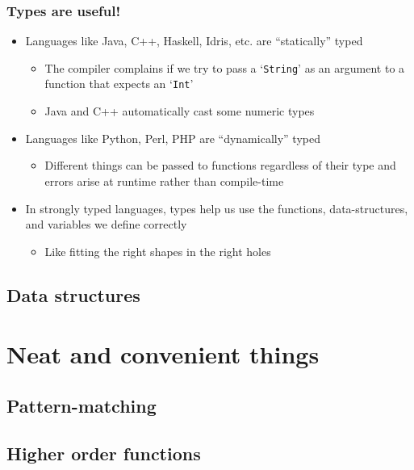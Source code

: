 \documentclass{beamer}
\begin{document}
  \begin{frame}
    \frametitle{Types are useful!}

    \begin{itemize}
      \item Languages like Java, C++, Haskell, Idris, etc. are ``statically''
            typed
        \begin{itemize}
          \item The compiler complains if we try to pass a `\texttt{String}' as an
                argument to a function that expects an `\texttt{Int}'
          \item Java and C++ automatically cast some numeric types
        \end{itemize}
      \item Languages like Python, Perl, PHP are ``dynamically'' typed
        \begin{itemize}
          \item Different things can be passed to functions regardless of their
                type and errors arise at runtime rather than compile-time
        \end{itemize}
      \item In strongly typed languages, types help us use the functions,
            data-structures, and variables we define correctly
        \begin{itemize}
          \item Like fitting the right shapes in the right holes
        \end{itemize}
    \end{itemize}

  \end{frame}

  \subsection{Data structures}


\section{Neat and convenient things}
  \subsection{Pattern-matching}

  \subsection{Higher order functions}
\end{document}
